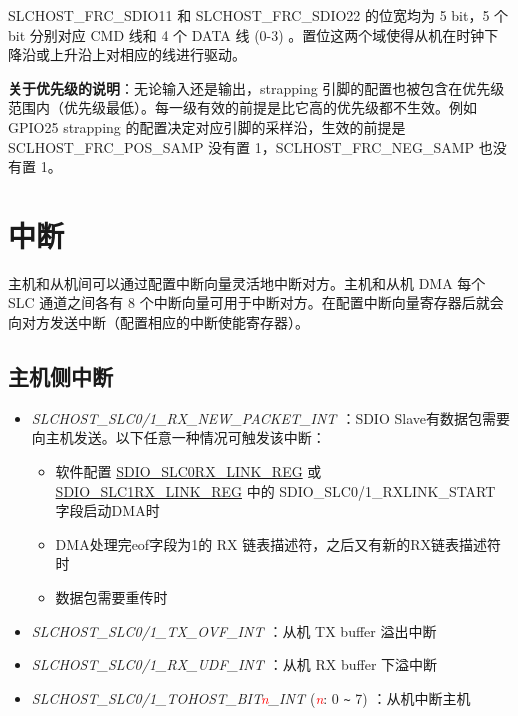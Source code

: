 \documentclass[main\_\_CN.tex]{subfiles}
\begin{document}
SLCHOST\_FRC\_SDIO11 和 SLCHOST\_FRC\_SDIO22 的位宽均为 5 bit，5 个 bit 分别对应 CMD 线和 4 个 DATA 线 (0-3) 。置位这两个域使得从机在时钟下降沿或上升沿上对相应的线进行驱动。

\textbf{关于优先级的说明}：无论输入还是输出，strapping 引脚的配置也被包含在优先级范围内（优先级最低）。每一级有效的前提是比它高的优先级都不生效。例如 GPIO25 strapping 的配置决定对应引脚的采样沿，生效的前提是 SCLHOST\_FRC\_POS\_SAMP 没有置 1，SCLHOST\_FRC\_NEG\_SAMP 也没有置 1。

\section{中断}

主机和从机间可以通过配置中断向量灵活地中断对方。主机和从机 DMA 每个 SLC 通道之间各有 8 个中断向量可用于中断对方。在配置中断向量寄存器后就会向对方发送中断（配置相应的中断使能寄存器）。

\subsection{主机侧中断}
\begin{itemize}
\item {\it SLCHOST\_SLC0/1\_RX\_NEW\_PACKET\_INT \label{int:SLCHOSTSLC01RXNEWPACKETINT}}：SDIO Slave有数据包需要向主机发送。以下任意一种情况可触发该中断：
    \begin{itemize}
        \item 软件配置 \hyperref[regdesc:SDIOSLC0RXLINKREG]{SDIO\_SLC0RX\_LINK\_REG} 或 \hyperref[regdesc:SDIOSLC1RXLINKREG]{SDIO\_SLC1RX\_LINK\_REG} 中的 SDIO\_SLC0/1\_RXLINK\_START 字段启动DMA时
        \item DMA处理完eof字段为1的 RX 链表描述符，之后又有新的RX链表描述符时
        \item 数据包需要重传时
    \end{itemize}
\item {\it SLCHOST\_SLC0/1\_TX\_OVF\_INT \label{int:SLCHOSTSLC01TXOVFINT}}：从机 TX buffer 溢出中断
\item {\it SLCHOST\_SLC0/1\_RX\_UDF\_INT \label{int:SLCHOSTSLC01RXUDFINT}}：从机 RX buffer 下溢中断
\item {\it SLCHOST\_SLC0/1\_TOHOST\_BIT\textcolor{red}{\it{n}}\_INT \label{int:SLCHOSTSLC01TOHOSTBITnINT}} (\textcolor{red}{\it{n}}: 0 \verb+~+ 7) ：从机中断主机
\end{itemize}
\end{document}
